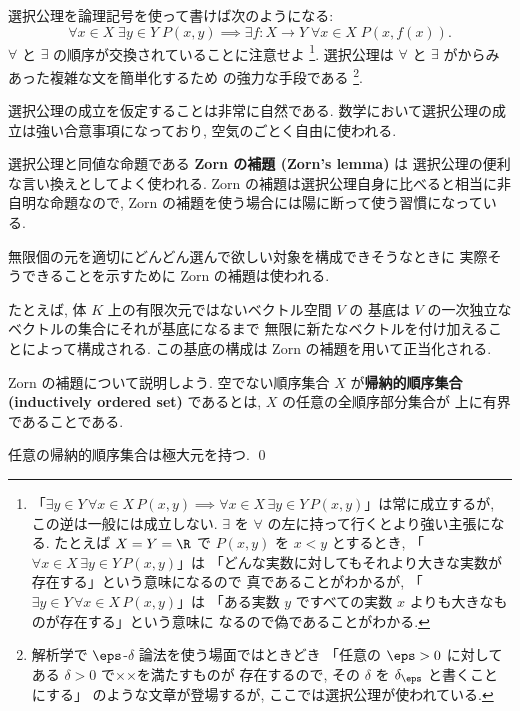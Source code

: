 \documentclass[12pt,twoside]{jarticle}
\begin{document}
選択公理を論理記号を使って書けば次のようになる:
\begin{equation*}
  \forall x\in X\; \exists y\in Y\; P(x,y)
  \implies
  \exists f:X\to Y\; \forall x\in X\; P(x,f(x)).
  \tag{AC}
\end{equation*}
$\forall$ と $\exists$ の順序が交換されていることに注意せよ%
\footnote{「$\exists y\in Y\, \forall x\in X\, P(x,y)
  \implies \forall x\in X\, \exists y\in Y\, P(x,y)$」は常に成立するが,
  この逆は一般には成立しない. 
  $\exists$ を $\forall$ の左に持って行くとより強い主張になる.
  たとえば $X=Y=\R$ で $P(x,y)$ を $x<y$ とするとき,
  「$\forall x\in X\, \exists y\in Y\, P(x,y)$」は
  「どんな実数に対してもそれより大きな実数が存在する」という意味になるので
  真であることがわかるが, 「$\exists y\in Y\, \forall x\in X\, P(x,y)$」は
  「ある実数 $y$ ですべての実数 $x$ よりも大きなものが存在する」という意味に
  なるので偽であることがわかる.}.
選択公理は $\forall$ と $\exists$ がからみあった複雑な文を簡単化するため
の強力な手段である%
\footnote{解析学で $\eps$-$\delta$ 論法を使う場面ではときどき
  「任意の $\eps>0$ に対してある $\delta>0$ で××を満たすものが
  存在するので, その $\delta$ を $\delta_\eps$ と書くことにする」
  のような文章が登場するが, ここでは選択公理が使われている.}.

選択公理の成立を仮定することは非常に自然である.
数学において選択公理の成立は強い合意事項になっており, 
空気のごとく自由に使われる.

選択公理と同値な命題である {\bf Zorn の補題 (Zorn's lemma)} は
選択公理の便利な言い換えとしてよく使われる. 
Zorn の補題は選択公理自身に比べると相当に非自明な命題なので, 
Zorn の補題を使う場合には陽に断って使う習慣になっている.

無限個の元を適切にどんどん選んで欲しい対象を構成できそうなときに
実際そうできることを示すために Zorn の補題は使われる.

たとえば, 体 $K$ 上の有限次元ではないベクトル空間 $V$ の
基底は $V$ の一次独立なベクトルの集合にそれが基底になるまで
無限に新たなベクトルを付け加えることによって構成される. 
この基底の構成は Zorn の補題を用いて正当化される.

Zorn の補題について説明しよう.  空でない順序集合 $X$ が{\bf 帰納的順序集合 
(inductively ordered set)} であるとは, $X$ の任意の全順序部分集合が
上に有界であることである.  

\begin{lemma}
\label{lemma:Zorn}
  任意の帰納的順序集合は極大元を持つ. \qed
\end{lemma}
\end{document}
